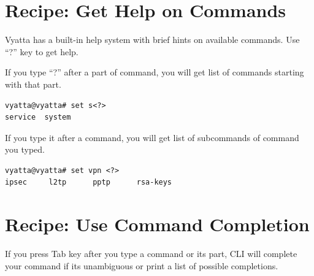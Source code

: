 \section{Recipe: Get Help on Commands}
Vyatta has a built-in help system with brief hints on available commands. Use ``?'' key to get help.

If you type ``?'' after a part of command, you will get list of commands starting with that part.
\begin{verbatim}
vyatta@vyatta# set s<?>
service  system   
\end{verbatim}
If you type it after a command, you will get list of subcommands of command you typed.
\begin{verbatim}
vyatta@vyatta# set vpn <?>
ipsec     l2tp      pptp      rsa-keys  
\end{verbatim}

\section{Recipe: Use Command Completion}
If you press Tab key after you type a command or its part, CLI will complete your command if its unambiguous or
print a list of possible completions.

